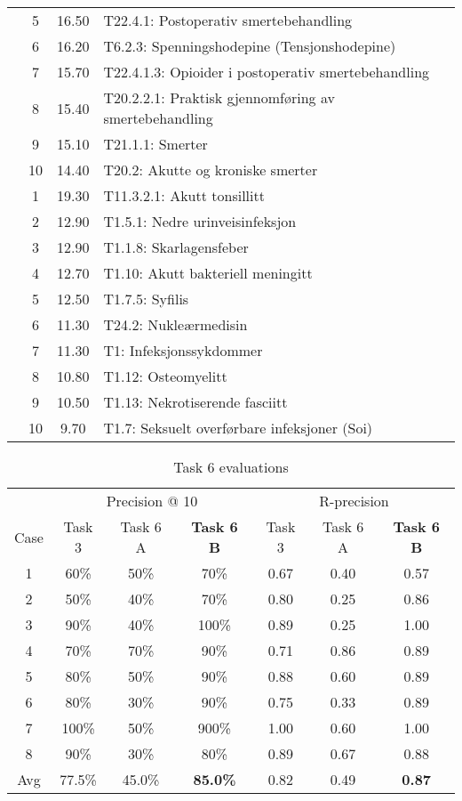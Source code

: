 \begin{table}[htbp]
\begin{tabular}{c c c l}
     & 5 & 16.50 & T22.4.1: Postoperativ smertebehandling \\
     & 6 & 16.20 & T6.2.3: Spenningshodepine (Tensjonshodepine) \\
     & 7 & 15.70 & T22.4.1.3: Opioider i postoperativ smertebehandling \\
     & 8 & 15.40 & T20.2.2.1: Praktisk gjennomføring av smertebehandling \\%
     & 9 & 15.10 & T21.1.1: Smerter \\
     & 10 & 14.40 & T20.2: Akutte og kroniske smerter \\
	\addlinespace
    8 & 1 & 19.30 & T11.3.2.1: Akutt tonsillitt \\
     & 2 & 12.90 & T1.5.1: Nedre urinveisinfeksjon \\
     & 3 & 12.90 & T1.1.8: Skarlagensfeber \\
     & 4 & 12.70 & T1.10: Akutt bakteriell meningitt \\
     & 5 & 12.50 & T1.7.5: Syfilis \\
     & 6 & 11.30 & T24.2: Nukleærmedisin \\
     & 7 & 11.30 & T1: Infeksjonssykdommer \\
     & 8 & 10.80 & T1.12: Osteomyelitt \\
     & 9 & 10.50 & T1.13: Nekrotiserende fasciitt \\
     & 10 & 9.70 & T1.7: Seksuelt overførbare infeksjoner (Soi) \\
	\bottomrule
\end{tabular}
\end{table}

\begin{table}[htbp] \footnotesize \center
\caption{Task 6 evaluations\label{tab:task6eval}}
\begin{tabular}{c c c c c c c}
    \toprule
    & \multicolumn{3}{c}{Precision @ 10} & \multicolumn{3}{c}{R-precision} \\
	\cmidrule(r){2-7}
	Case & Task 3 & Task 6 A & \textbf{Task 6 B} & Task 3 & Task 6 A & \textbf{Task 6 B} \\
    \midrule
	1 & 60\% & 50\% & 70\% & 0.67 & 0.40 & 0.57 \\
	2 & 50\% & 40\% & 70\% & 0.80 & 0.25 & 0.86 \\
	3 & 90\% & 40\% & 100\% & 0.89 & 0.25 & 1.00 \\
	4 & 70\% & 70\% & 90\% & 0.71 & 0.86 & 0.89 \\
	5 & 80\% & 50\% & 90\% & 0.88 & 0.60 & 0.89 \\
	6 & 80\% & 30\% & 90\% & 0.75 & 0.33 & 0.89 \\
	7 & 100\% & 50\% & 900\% & 1.00 & 0.60 & 1.00 \\
	8 & 90\% & 30\% & 80\% & 0.89 & 0.67 & 0.88 \\
	Avg & 77.5\% & 45.0\% & \textbf{85.0\%} & 0.82 & 0.49 & \textbf{0.87} \\
	\bottomrule
\end{tabular}
\end{table}

